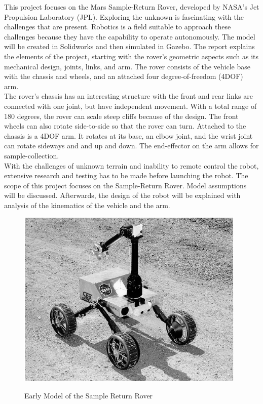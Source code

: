 \noindent
This project focuses on the Mars Sample-Return Rover, developed by NASA's Jet Propulsion Laboratory (JPL). Exploring the unknown is fascinating with the challenges that are present. Robotics is a field suitable to approach these challenges because they have the capability to operate autonomously. The model will be created in Solidworks and then simulated in Gazebo. The report explains the elements of the project, starting with the rover's geometric aspects such as its mechanical design, joints, links, and arm. The rover consists of the vehicle base with the chassis and wheels, and an attached four degree-of-freedom (4DOF) arm.\\

The rover's chassis has an interesting structure with the front and rear links are connected with one joint, but have independent movement. With a total range of 180 degrees, the rover can scale steep cliffs because of the design. The front wheels can also rotate side-to-side so that the rover can turn. Attached to the chassis is a 4DOF arm. It rotates at its base, an elbow joint, and the wrist joint can rotate sideways and and up and down. The end-effector on the arm allows for sample-collection. \\

With the challenges of unknown terrain and inability to remote control the robot, extensive research and testing has to be made before launching the robot. The scope of this project focuses on the Sample-Return Rover. Model assumptions will be discussed. Afterwards, the design of the robot will be explained with analysis of the kinematics of the vehicle and the arm.

\begin{figure}[htb]
	\centering
	\includegraphics[scale=0.70]{sections/introduction/images/srr.png}
	\label{sample_return_rover:introduction:sample_return_rover}
	\caption{Early Model of the Sample Return Rover}
\end{figure}


